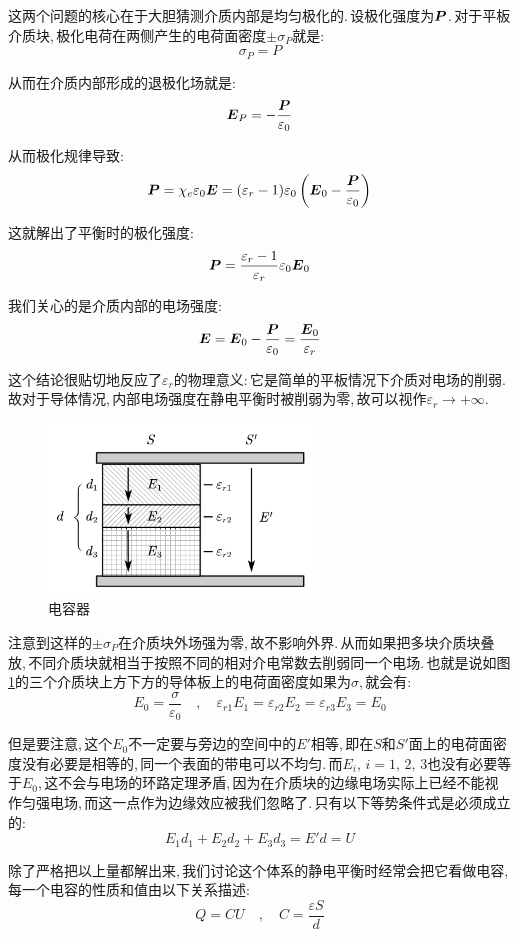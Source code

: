 这两个问题的核心在于大胆猜测介质内部是均匀极化的.\,设极化强度为$\boldsymbol{P}$.\,对于平板介质块,\,极化电荷在两侧产生的电荷面密度$\pm \sigma_P$就是:
\[\sigma_P=P\]

从而在介质内部形成的退极化场就是:
\[\boldsymbol{E}_P=-\frac{\boldsymbol{P}}{\varepsilon_0}\]

从而极化规律导致:
\[\boldsymbol{P}=\chi_e \varepsilon_0 \boldsymbol{E}=(\varepsilon_r-1)\varepsilon_0\left( \boldsymbol{E}_0 -\frac{\boldsymbol{P}}{\varepsilon_0}\right)\]

这就解出了平衡时的极化强度:
\[\boldsymbol{P}=\frac{\varepsilon_r-1}{\varepsilon_r}\varepsilon_0 \boldsymbol{E}_0\]

我们关心的是介质内部的电场强度:
\[\boldsymbol{E}=\boldsymbol{E}_0 -\frac{\boldsymbol{P}}{\varepsilon_0}=\frac{ \boldsymbol{E}_0}{\varepsilon_r}\]

这个结论很贴切地反应了$\varepsilon_r$的物理意义:\,它是简单的平板情况下介质对电场的削弱.\,故对于导体情况,\,内部电场强度在静电平衡时被削弱为零,\,故可以视作$\varepsilon_r\to +\infty$.

\begin{figure}
\vspace{-0.2cm}
\centering
\includegraphics[width=7cm]{image/7-2-13.png}
\caption{电容器}\label{fig7-2-13}
\end{figure}
注意到这样的$\pm\sigma_P$在介质块外场强为零,\,故不影响外界.\,从而如果把多块介质块叠放,\,不同介质块就相当于按照不同的相对介电常数去削弱同一个电场.\,也就是说如图\ref{fig7-2-13}的三个介质块上方下方的导体板上的电荷面密度如果为$\sigma$,\,就会有:
\[E_0=\frac{\sigma}{\varepsilon_0}\quad ,\quad \varepsilon_{r1}E_1=\varepsilon_{r2}E_2=\varepsilon_{r3}E_3=E_0\]

但是要注意,\,这个$E_0$不一定要与旁边的空间中的$E'$相等,\,即在$S$和$S'$面上的电荷面密度没有必要是相等的,\,同一个表面的带电可以不均匀.\,而$E_i,\,i=1,\,2,\,3$也没有必要等于$E_0$,\,这不会与电场的环路定理矛盾,\,因为在介质块的边缘电场实际上已经不能视作匀强电场,\,而这一点作为边缘效应被我们忽略了.\,只有以下等势条件式是必须成立的:
\[E_1d_1+E_2d_2+E_3d_3=E'd=U\]

除了严格把以上量都解出来,\,我们讨论这个体系的静电平衡时经常会把它看做电容,\,每一个电容的性质和值由以下关系描述:
\[Q=CU\quad ,\quad C=\frac{\varepsilon S}{d}\]

